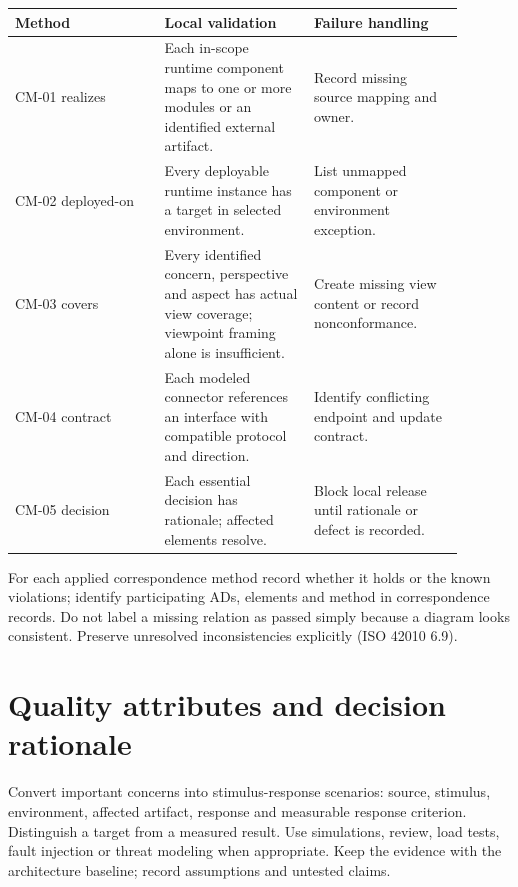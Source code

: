 \documentclass[11pt,letterpaper]{article}
\newcommand{\docsection}[1]{\Needspace{5\baselineskip}\section{#1}}
\begin{document}
\begin{longtable}{@{}>{\RaggedRight\arraybackslash}p{0.297\linewidth}>{\RaggedRight\arraybackslash}p{0.297\linewidth}>{\RaggedRight\arraybackslash}p{0.297\linewidth}@{}}
\toprule
\textbf{Method} & \textbf{Local validation} & \textbf{Failure handling}\\\midrule
\endhead
CM-01 realizes & Each in-scope runtime component maps to one or more modules or an identified external artifact. & Record missing source mapping and owner.\\
CM-02 deployed-on & Every deployable runtime instance has a target in selected environment. & List unmapped component or environment exception.\\
CM-03 covers & Every identified concern, perspective and aspect has actual view coverage; viewpoint framing alone is insufficient. & Create missing view content or record nonconformance.\\
CM-04 contract & Each modeled connector references an interface with compatible protocol and direction. & Identify conflicting endpoint and update contract.\\
CM-05 decision & Each essential decision has rationale; affected elements resolve. & Block local release until rationale or defect is recorded.\\
\bottomrule
\end{longtable}
For each applied correspondence method record whether it holds or the known violations; identify participating ADs, elements and method in correspondence records. Do not label a missing relation as passed simply because a diagram looks consistent. Preserve unresolved inconsistencies explicitly (ISO 42010 6.9).

\docsection{Quality attributes and decision rationale}
Convert important concerns into stimulus-response scenarios: source, stimulus, environment, affected artifact, response and measurable response criterion. Distinguish a target from a measured result. Use simulations, review, load tests, fault injection or threat modeling when appropriate. Keep the evidence with the architecture baseline; record assumptions and untested claims.
\end{document}
